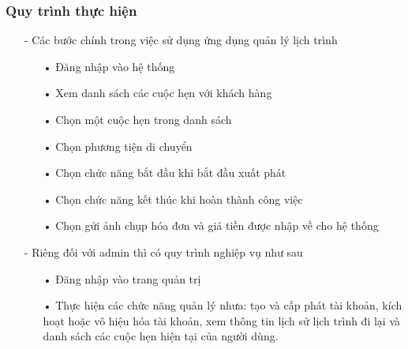 \documentclass[a4paper]{article}
\begin{document}
\subsubsection{Quy trình thực hiện}
\begin{itemize}    
    \item[-] Các bước chính trong việc sử dụng ứng dụng quản lý lịch trình  
    \begin{itemize}  
        \item[•] Đăng nhập vào hệ thống
        \item[•] Xem danh sách các cuộc hẹn với khách hàng
        \item[•] Chọn một cuộc hẹn trong danh sách
        \item[•] Chọn phương tiện di chuyển 
        \item[•] Chọn chức năng bắt đầu khi bắt đầu xuất phát
        \item[•] Chọn chức năng kết thúc khi hoàn thành công việc
        \item[•] Chọn gửi ảnh chụp hóa đơn và giá tiền được nhập về cho hệ thống
    \end{itemize}
    \item[-] Riêng đối với admin thì có quy trình nghiệp vụ như sau 
    \begin{itemize}  
        \item[•] Đăng nhập vào trang quản trị
        \item[•] Thực hiện các chức năng quản lý nhưa: tạo và cấp phát tài khoản, kích hoạt hoặc vô hiệu hóa tài khoản, xem thông tin lịch sử lịch trình đi lại và danh sách các cuộc hẹn hiện tại của người dùng.
    \end{itemize}  
\end{itemize}
\end{document}
